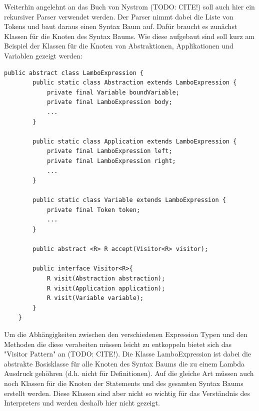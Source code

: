 \documentclass[ngerman]{article}
\begin{document}
Weiterhin angelehnt an das Buch von Nystrom (TODO: CITE!) soll auch hier ein rekursiver Parser verwendet werden. Der Parser nimmt dabei die Liste von Tokens und baut daraus einen Syntax Baum auf. Dafür braucht es zunächst Klassen für die Knoten des Syntax Baums. Wie diese aufgebaut sind soll kurz am Beispiel der Klassen für die Knoten von Abstraktionen, Applikationen und Variablen gezeigt werden:
\begin{lstlisting}[caption={TODO: Referenz zu Anhang}, captionpos=b]
    public abstract class LamboExpression {
        public static class Abstraction extends LamboExpression {
            private final Variable boundVariable;
            private final LamboExpression body;
            ...
        }
    
        public static class Application extends LamboExpression {
            private final LamboExpression left;
            private final LamboExpression right;
            ...
        }
    
        public static class Variable extends LamboExpression {
            private final Token token;
            ...
        }
    
        public abstract <R> R accept(Visitor<R> visitor);
    
        public interface Visitor<R>{
            R visit(Abstraction abstraction);
            R visit(Application application);
            R visit(Variable variable);
        }
    }
\end{lstlisting}
Um die Abhängigkeiten zwischen den verschiedenen Expression Typen und den Methoden die diese verabeiten müssen leicht zu entkoppeln bietet sich das "Visitor Pattern" an (TODO: CITE!). Die Klasse LamboExpression ist dabei die abstrakte Basisklasse für alle Knoten des Syntax Baums die zu einem Lambda Ausdruck gehöhren (d.h. nicht für Definitionen). Auf die gleiche Art müssen auch noch Klassen für die Knoten der Statements und des gesamten Syntax Baums erstellt werden. Diese Klassen sind aber nicht so wichtig für das Verständnis des Interpreters und werden deshalb hier nicht gezeigt.
\end{document}
